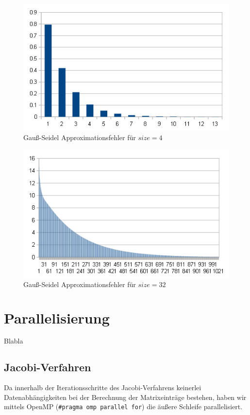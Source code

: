 \documentclass{article}
\begin{document}
\begin{figure}[htbp] 
  \centering
     \includegraphics[width=1\textwidth]{bilder/dgs4.png}
  \caption{Gauß-Seidel Approximationsfehler für $size=4$}
  \label{fig:Bild4}
\end{figure}
\begin{figure}[htbp] 
  \centering
     \includegraphics[width=1\textwidth]{bilder/dgs32.png}
  \caption{Gauß-Seidel Approximationsfehler für $size=32$}
  \label{fig:Bild5}
\end{figure}
\section{Parallelisierung}
Blabla
\subsection{Jacobi-Verfahren} \label{parallel:jacobi}
Da innerhalb der Iterationsschritte des Jacobi-Verfahrens keinerlei Datenabhängigkeiten bei der Berechnung der Matrixeinträge bestehen, haben wir mittels OpenMP (\texttt{\#pragma omp parallel for}) die äußere Schleife parallelisiert.
\end{document}
